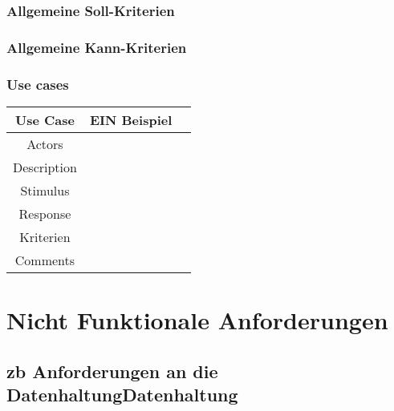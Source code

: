 \documentclass{scrreprt}
\begin{document}
\subsection{Allgemeine Soll-Kriterien}
\subsection{Allgemeine Kann-Kriterien}
\subsection{Use cases}

\begin{center}
\begin{tabular}{|c|c|c|}
	\hline
	\rowcolor{LightCyan}
	\rule[-1ex]{0pt}{2.5ex} Use Case & EIN Beispiel \\
	\hline
	\rule[-1ex]{0pt}{2.5ex} Actors &  \\
	\hline
	\rule[-1ex]{0pt}{2.5ex} Description &  \\
	\hline
	\rule[-1ex]{0pt}{2.5ex} Stimulus &  \\
	\hline
	\rule[-1ex]{0pt}{2.5ex} Response &  \\
	\hline
	\rule[-1ex]{0pt}{2.5ex} Kriterien &  \\
	\hline
	\rule[-1ex]{0pt}{2.5ex} Comments &  \\
	\hline
\end{tabular}
\end{center}

\chapter{Nicht Funktionale Anforderungen}
\section{zb Anforderungen an die DatenhaltungDatenhaltung}
\end{document}
